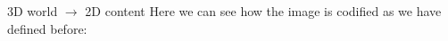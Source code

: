 \begin{frame}{\secname}{3D world $\rightarrow$ 2D content}  
    Here we can see how the image is codified as we have defined before:
    \begin{figure}
        \centering
        \qquad
    \end{figure}
\end{frame}

